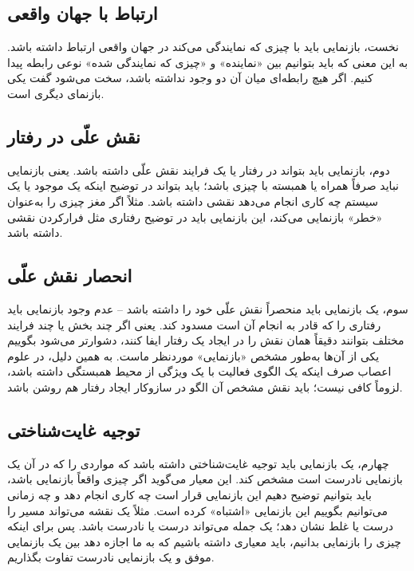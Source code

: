 \subsection{ارتباط با جهان واقعی}
\label{sub:criterion-real-world-connection}

نخست، بازنمایی باید با چیزی که نمایندگی می‌کند در جهان واقعی ارتباط داشته باشد. به این معنی که باید بتوانیم بین «نماینده» و «چیزی که نمایندگی شده» نوعی رابطه پیدا کنیم. اگر هیچ رابطه‌ای میان آن دو وجود نداشته باشد، سخت می‌شود گفت یکی بازنمای دیگری است.

\subsection{نقش علّی در رفتار}
\label{sub:criterion-causal-role}

دوم، بازنمایی باید بتواند در رفتار یا یک فرایند نقش علّی داشته باشد. یعنی بازنمایی نباید صرفاً همراه یا همبسته با چیزی باشد؛ باید بتواند در توضیح اینکه یک موجود یا یک سیستم چه کاری انجام می‌دهد نقشی داشته باشد. مثلاً اگر مغز چیزی را به‌عنوان «خطر» بازنمایی می‌کند، این بازنمایی باید در توضیح رفتاری مثل فرارکردن نقشی داشته باشد.

\subsection{انحصار نقش علّی}
\label{sub:criterion-exclusivity}

سوم، یک بازنمایی باید منحصراً نقش علّی خود را داشته باشد -- عدم وجود بازنمایی باید رفتاری را که قادر به انجام آن است مسدود کند. یعنی اگر چند بخش یا چند فرایند مختلف بتوانند دقیقاً همان نقش را در ایجاد یک رفتار ایفا کنند، دشوارتر می‌شود بگوییم یکی از آن‌ها به‌طور مشخص «بازنمایی» موردنظر ماست. به همین دلیل، در علوم اعصاب صرف اینکه یک الگوی فعالیت با یک ویژگی از محیط همبستگی داشته باشد، لزوماً کافی نیست؛ باید نقش مشخص آن الگو در سازوکار ایجاد رفتار هم روشن باشد.
\newpage
\subsection{توجیه غایت‌شناختی}
\label{sub:criterion-teleological}

چهارم، یک بازنمایی باید توجیه غایت‌شناختی داشته باشد که مواردی را که در آن یک بازنمایی نادرست است مشخص کند. این معیار می‌گوید اگر چیزی واقعاً بازنمایی باشد، باید بتوانیم توضیح دهیم این بازنمایی قرار است چه کاری انجام دهد و چه زمانی می‌توانیم بگوییم این بازنمایی «اشتباه» کرده است. مثلاً یک نقشه می‌تواند مسیر را درست یا غلط نشان دهد؛ یک جمله می‌تواند درست یا نادرست باشد. پس برای اینکه چیزی را بازنمایی بدانیم، باید معیاری داشته باشیم که به ما اجازه دهد بین یک بازنمایی موفق و یک بازنمایی نادرست تفاوت بگذاریم.
\newpage
